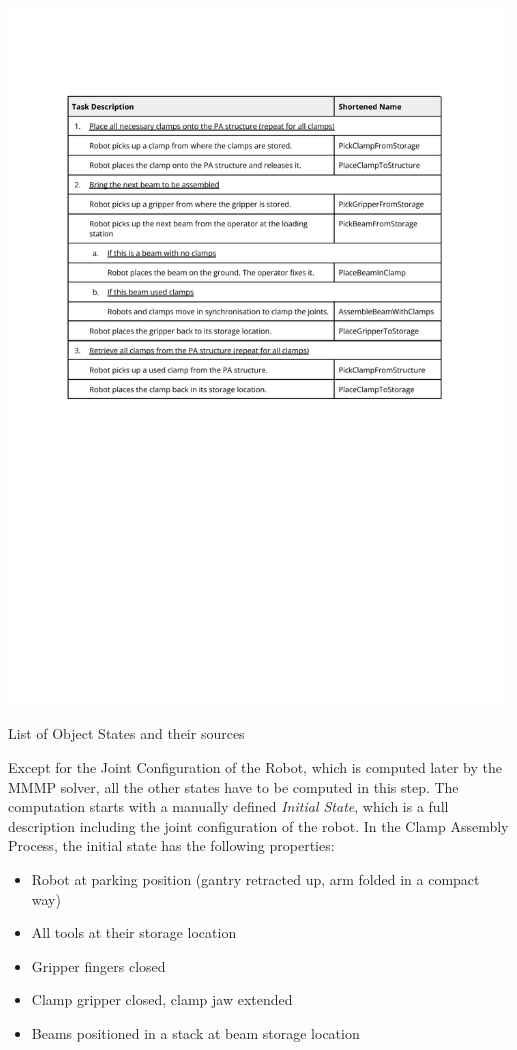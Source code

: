 \begin{table}[!h]
    \includegraphics[page=5, trim=25.4mm 190mm 25.4mm 33mm, clip, width=0.98\textwidth]{tables/Tables in Chapter 6.pdf}
    \caption{List of Object States and their sources}
    \label{table:object-states-list-and-sources}
\end{table}

Except for the Joint Configuration of the Robot, which is computed later by the MMMP solver, all the other states have to be computed in this step. The computation starts with a manually defined \textit{Initial State}, which is a full description including the joint configuration of the robot. In the Clamp Assembly Process, the initial state has the following properties:

\begin{itemize}
	\item Robot at parking position (gantry retracted up, arm folded in a compact way)
	\item All tools at their storage location
	\item Gripper fingers closed
	\item Clamp gripper closed, clamp jaw extended
	\item Beams positioned in a stack at beam storage location 
\end{itemize}

